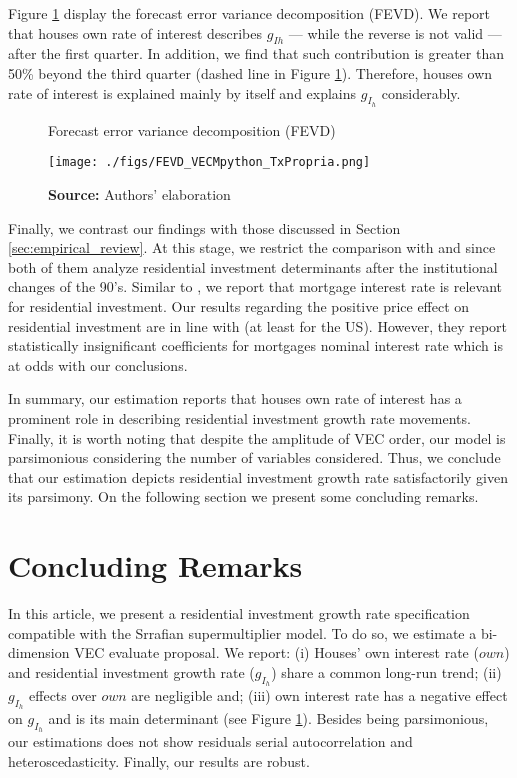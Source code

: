 \documentclass[12pt, a4paper]{article}
\begin{document}
Figure \ref{fevd} display the forecast error variance decomposition (FEVD).
We report that houses own rate of interest describes \(g_{Ih}\) --- while the reverse is not valid --- after the first quarter.
In addition, we find that such contribution is greater than 50\% beyond the third quarter (dashed line in Figure \ref{fevd}).
Therefore, houses own rate of interest is explained mainly by itself and explains \(g_{I_h}\) considerably.

\begin{figure}[H]
	\centering
	\caption{Forecast error variance decomposition (FEVD)}
	\label{fevd}
	\texttt{[image: ./figs/FEVD\_VECMpython\_TxPropria.png]}
	\caption*{\textbf{Source:} Authors' elaboration}
\end{figure}


Finally,  we contrast our findings with those discussed in Section \ref{sec:empirical_review}.
At this stage, we restrict the comparison with  \textcite{gauger_residential_2003} and \textcite{arestis_residential_2015} since both of them analyze residential investment determinants after the institutional changes of the 90's.
Similar to \textcite{gauger_residential_2003}, we report that mortgage interest rate is relevant for residential investment.
Our results regarding the positive price effect on residential investment are in line with \textcite{arestis_residential_2015} (at least for the US).
However, they report statistically insignificant coefficients for mortgages nominal interest rate which is at odds with our conclusions.

In summary, our estimation reports that houses own rate of interest has a prominent role in describing residential investment growth rate movements.
Finally, it is worth noting that despite the amplitude of VEC order, our model is parsimonious considering the number of variables considered.
Thus, we conclude that our estimation depicts residential investment growth rate satisfactorily given its parsimony.
On the following section we present some concluding remarks.

\section{Concluding Remarks}
\label{sec:org9da904e}
\label{sec:Conclusion}
In this article, we present a residential investment growth rate specification compatible with the Srrafian supermultiplier model.
To do so, we estimate a bi-dimension VEC evaluate \textcite{teixeira_crescimento_2015}
proposal. 
We report: 
	(i) Houses' own interest rate (\(own\)) and residential investment growth rate (\(g_{I_h}\)) share a common long-run trend;
	(ii) \(g_{I_h}\) effects over \(own\) are negligible and; 
	(iii) own interest rate has a negative effect on \(g_{I_h}\) and is its main determinant (see Figure \ref{fevd}).
Besides being parsimonious, our estimations does not show residuals serial autocorrelation and heteroscedasticity.
Finally, our results are robust.
\end{document}
